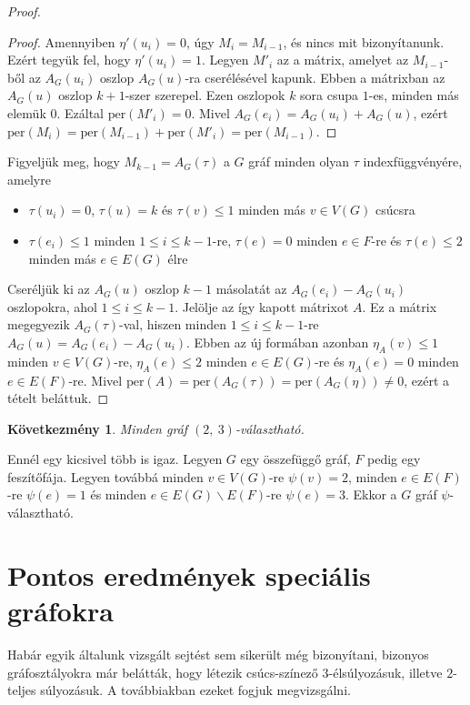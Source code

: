 \documentclass[12pt, a4paper]{report}
\newtheorem{köv}[tét]{Következmény}
\theoremstyle{remark}
\theoremstyle{definition}
\begin{document}
\begin{proof}
\begin{proof}
Amennyiben $\eta'(u_i) = 0$, úgy $M_i = M_{i - 1}$, és nincs mit bizonyítanunk. Ezért tegyük fel, hogy $\eta'(u_i) = 1$. Legyen $M'_i$ az a mátrix, amelyet az $M_{i - 1}$-ből az $A_G(u_i)$ oszlop $A_G(u)$-ra cserélésével kapunk. Ebben a mátrixban az $A_G(u)$ oszlop $k + 1$-szer szerepel. Ezen oszlopok $k$ sora csupa $1$-es, minden más elemük $0$. Ezáltal $\mathrm{per}(M'_i) = 0$. Mivel $A_G(e_i) = A_G(u_i) + A_G(u)$, ezért $\mathrm{per}(M_i) = \mathrm{per}(M_{i - 1}) + \mathrm{per}(M'_i) = \mathrm{per}(M_{i - 1})$.
\end{proof}

Figyeljük meg, hogy $M_{k - 1} = A_G(\tau)$ a $G$ gráf minden olyan $\tau$ indexfüggvényére, amelyre
\begin{itemize}
\item $\tau(u_i) = 0$, $\tau(u) = k$ és $\tau(v) \leq 1$ minden más $v \in V(G)$ csúcsra
\item $\tau(e_i) \leq 1$ minden $1 \leq i \leq k - 1$-re, $\tau(e) = 0$ minden $e \in F$-re és $\tau(e) \leq 2$ minden más $e \in E(G)$ élre
\end{itemize}

Cseréljük ki az $A_G(u)$ oszlop $k - 1$ másolatát az $A_G(e_i) - A_G(u_i)$ oszlopokra, ahol $1 \leq i \leq k - 1$. Jelölje az így kapott mátrixot $A$. Ez a mátrix megegyezik $A_G(\tau)$-val, hiszen minden $1 \leq i \leq k - 1$-re $A_G(u) = A_G(e_i) - A_G(u_i)$. Ebben az új formában azonban $\eta_A(v) \leq 1$ minden $v \in V(G)$-re, $\eta_A(e) \leq 2$ minden $e \in E(G)$-re és $\eta_A(e) = 0$ minden $e \in E(F)$-re. Mivel $\mathrm{per}(A) = \mathrm{per}(A_G(\tau)) = \mathrm{per}(A_G(\eta)) \neq 0$, ezért a tételt beláttuk.
\end{proof}

\begin{köv}
Minden gráf $(2,\ 3)$-választható.
\end{köv}

Ennél egy kicsivel több is igaz. Legyen $G$ egy összefüggő gráf, $F$ pedig egy feszítőfája. Legyen továbbá minden $v \in V(G)$-re $\psi(v) = 2$, minden $e \in E(F)$-re $\psi(e) = 1$ és minden $e \in E(G) \smallsetminus E(F)$-re $\psi(e) = 3$. Ekkor a $G$ gráf $\psi$-választható. 

\chapter{Pontos eredmények speciális gráfokra}
Habár egyik általunk vizsgált sejtést sem sikerült még bizonyítani, bizonyos gráfosztályokra már belátták, hogy létezik csúcs-színező $3$-élsúlyozásuk, illetve $2$-teljes súlyozásuk. A továbbiakban ezeket fogjuk megvizsgálni.
\end{document}
